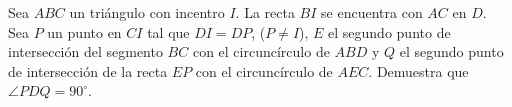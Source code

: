 Sea $ABC$ un triángulo con incentro $I$. La recta $BI$ se encuentra con $AC$ en $D$. Sea $P$ un punto en $CI$ tal que $DI=DP$, ($P\ne I$), $E$ el segundo punto de intersección del segmento $BC$ con el circuncírculo de $ABD$ y $Q$ el segundo punto de intersección de la recta $EP$ con el circuncírculo de $AEC$. Demuestra que $\angle PDQ=90^{\circ}$.
